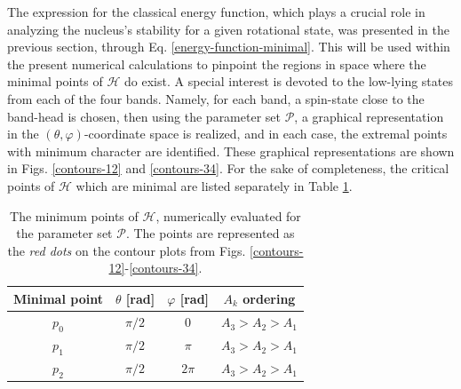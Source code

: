 \documentclass[myclassdoc,debug]{rjparticle}
\begin{document}
The expression for the classical energy function, which plays a crucial role in analyzing the nucleus's stability for a given rotational state, was presented in the previous section, through Eq. \ref{energy-function-minimal}. This will be used within the present numerical calculations to pinpoint the regions in space where the minimal points of $\mathcal{H}$ do exist. A special interest is devoted to the low-lying states from each of the four bands. Namely, for each band, a spin-state close to the band-head is chosen, then using the parameter set $\mathcal{P}$, a graphical representation in the $(\theta,\varphi)$-coordinate space is realized, and in each case, the extremal points with minimum character are identified. These graphical representations are shown in Figs. \ref{contours-12} and \ref{contours-34}. For the sake of completeness, the critical points of $\mathcal{H}$ which are minimal are listed separately in Table \ref{critical_points_h}.

\begin{table}[ht]
\caption{The minimum points of $\mathcal{H}$, numerically evaluated for the parameter set $\mathcal{P}$. The points are represented as the \emph{red dots} on the contour plots from Figs. \ref{contours-12}-\ref{contours-34}.}
    \centering
\begin{tabular}{cccc}
\hline
Minimal point & $\theta$ [rad] & $\varphi$ [rad] & $A_k$ ordering \\
\hline
\hline
$p_0$         & $\pi/2$       &    $0$       &      $A_3>A_2>A_1$          \\
$p_1$         & $\pi/2$      &   $\pi$    &      $A_3>A_2>A_1$          \\
$p_2$         & $\pi/2$     &   $2\pi$        &      $A_3>A_2>A_1$ \\
\hline
\end{tabular}
    \label{critical_points_h}
\end{table}
\end{document}
